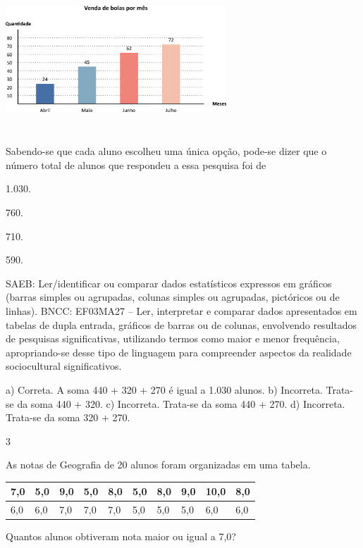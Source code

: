 \begin{multicols}{2}
{\begin{escolha}
{%

\includegraphics[width=3.25862in,height=2.14185in]{media/image105.png}

Sabendo-se que cada aluno escolheu uma única opção, pode-se dizer que o
número total de alunos que respondeu a essa pesquisa foi de

\begin{escolha}
\item
  1.030.
\item
  760.
\item
  710.
\item
  590.
\end{escolha}

SAEB: Ler/identificar ou comparar dados estatísticos expressos em gráficos (barras simples ou agrupadas, colunas simples ou agrupadas, pictóricos ou de linhas). 
BNCC: EF03MA27 -- Ler, interpretar e comparar dados apresentados em tabelas de dupla entrada,
gráficos de barras ou de colunas, envolvendo resultados de pesquisas significativas, utilizando
termos como maior e menor frequência, apropriando-se desse tipo de linguagem para
compreender aspectos da realidade sociocultural significativos.

a) Correta.  A soma 440 + 320 + 270 é igual a 1.030 alunos.
b) Incorreta. Trata-se da soma 440 + 320.
c) Incorreta. Trata-se da soma 440 + 270.
d) Incorreta. Trata-se da soma 320 + 270.

\num{3}

As notas de Geografia de 20 alunos foram organizadas em uma tabela.

\begin{longtable}[]{@{}llllllllll@{}}
\toprule
7,0 & 5,0 & 9,0 & 5,0 & 8,0 & 5,0 & 8,0 & 9,0 & 10,0 &
8,0\tabularnewline
\midrule
\endhead
6,0 & 6,0 & 7,0 & 7,0 & 7,0 & 5,0 & 5,0 & 5,0 & 6,0 & 6,0\tabularnewline
\bottomrule
\end{longtable}

Quantos alunos obtiveram nota maior ou igual a 7,0?

}
\end{escolha}}
\end{multicols}
